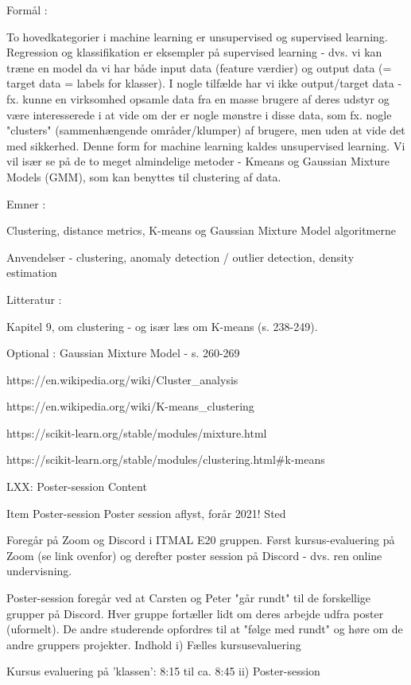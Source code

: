     Formål :

    To hovedkategorier i machine learning er unsupervised og supervised learning. Regression og klassifikation er eksempler på supervised learning - dvs. vi kan træne en model da vi har både input data (feature værdier) og output data (= target data = labels for klasser). I nogle tilfælde har vi ikke output/target data - fx.  kunne en virksomhed opsamle data fra en masse brugere af deres udstyr og være interesserede i at vide om der er nogle mønstre i disse data, som fx. nogle "clusters" (sammenhængende områder/klumper) af brugere, men uden at vide det med sikkerhed. Denne form for machine learning kaldes unsupervised learning. Vi vil især se på de to meget almindelige metoder - Kmeans og Gaussian Mixture Models (GMM), som kan benyttes til clustering af data.


    Emner :

    Clustering, distance metrics, K-means og Gaussian Mixture Model algoritmerne

    Anvendelser - clustering, anomaly detection / outlier detection, density estimation


    Litteratur :

    Kapitel 9, om clustering - og især læs om K-means (s. 238-249).

    Optional : Gaussian Mixture Model - s. 260-269

    https://en.wikipedia.org/wiki/Cluster_analysis 

    https://en.wikipedia.org/wiki/K-means_clustering

    https://scikit-learn.org/stable/modules/mixture.html

    https://scikit-learn.org/stable/modules/clustering.html#k-means 
    
    
LXX: Poster-session
Content

    Item
    Poster-session
    Poster session aflyst, forår 2021!
    Sted

    Foregår på Zoom og Discord i ITMAL E20 gruppen. Først kursus-evaluering på Zoom (se link ovenfor) og derefter poster session på Discord - dvs. ren online undervisning.

    Poster-session foregår ved at Carsten og Peter "går rundt" til de forskellige grupper på Discord. Hver gruppe fortæller lidt om deres arbejde udfra poster (uformelt). De andre studerende opfordres til at "følge med rundt" og høre om de andre gruppers projekter.
    Indhold
    i) Fælles kursusevaluering

    Kursus evaluering på 'klassen': 8:15 til ca. 8:45
    ii) Poster-session

